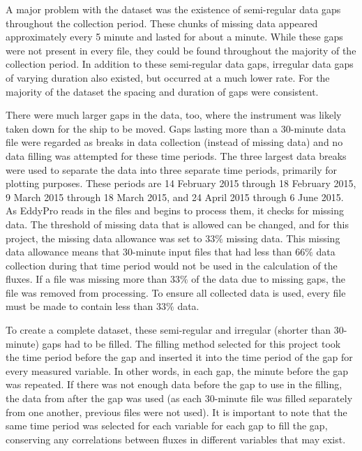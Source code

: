 A major problem with the dataset was the existence of semi-regular data gaps throughout the collection period. These chunks of missing data appeared approximately every 5 minute and lasted for about a minute. While these gaps were not present in every file, they could be found throughout the majority of the collection period. In addition to these semi-regular data gaps, irregular data gaps of varying duration also existed, but occurred at a much lower rate. For the majority of the dataset the spacing and duration of gaps were consistent.

There were much larger gaps in the data, too, where the instrument was likely taken down for the ship to be moved. Gaps lasting more than a 30-minute data file were regarded as breaks in data collection (instead of missing data) and no data filling was attempted for these time periods. The three largest data breaks were used to separate the data into three separate time periods, primarily for plotting purposes. These periods are 14 February 2015 through 18 February 2015, 9 March 2015 through 18 March 2015, and 24 April 2015 through 6 June 2015.  
As EddyPro reads in the files and begins to process them, it checks for missing data. The threshold of missing data that is allowed can be changed, and for this project, the missing data allowance was set to $33\%$ missing data. This missing data allowance means that 30-minute input files that had less than $66\%$ data collection during that time period would not be used in the calculation of the fluxes. If a file was missing more than $33\%$ of the data due to missing gaps, the file was removed from processing. To ensure all collected data is used, every file must be made to contain less than $33\%$ data. 
 
 To create a complete dataset, these semi-regular and irregular (shorter than 30-minute) gaps had to be filled. The filling method selected for this project took the time period before the gap and inserted it into the time period of the gap for every measured variable. In other words, in each gap, the minute before the gap was repeated. If there was not enough data before the gap to use in the filling, the data from after the gap was used (as each 30-minute file was filled separately from one another, previous files were not used). It is important to note that the same time period was selected for each variable for each gap to fill the gap, conserving any correlations between fluxes in different variables that may exist.  

